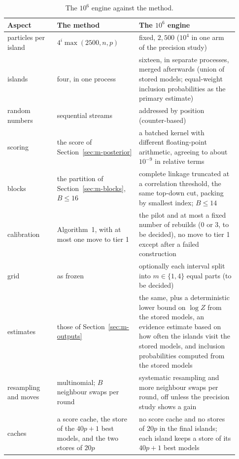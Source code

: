 \documentclass[11pt]{article}
\begin{document}
{\small
\begin{longtable}{@{}>{\raggedright\arraybackslash}p{0.2\linewidth}>{\raggedright\arraybackslash}p{0.33\linewidth}>{\raggedright\arraybackslash}p{0.4\linewidth}@{}}
\caption{The $10^6$ engine against the method.}\label{tab:m-1m}\\
\toprule
Aspect & The method & The $10^6$ engine \\ \midrule \endhead
particles per island & $4^i\max(2500,n,p)$ & fixed, $2{,}500$ ($10^4$ in one arm of the precision study) \\
islands & four, in one process & sixteen, in separate processes, merged afterwards (union of stored models; equal-weight inclusion probabilities as the primary estimate) \\
random numbers & sequential streams & addressed by position (counter-based) \\
scoring & the score of Section~\ref{sec:m-posterior} & a batched kernel with different floating-point arithmetic, agreeing to about $10^{-9}$ in relative terms \\
blocks & the partition of Section~\ref{sec:m-blocks}, $B\le16$ & complete linkage truncated at a correlation threshold, the same top-down cut, packing by smallest index; $B\le14$ \\
calibration & Algorithm~1, with at most one move to tier 1 & the pilot and at most a fixed number of rebuilds (0 or 3, to be decided), no move to tier 1 except after a failed construction \\
grid & as frozen & optionally each interval split into $m\in\{1,4\}$ equal parts (to be decided) \\
estimates & those of Section~\ref{sec:m-outputs} & the same, plus a deterministic lower bound on $\log Z$ from the stored models, an evidence estimate based on how often the islands visit the stored models, and inclusion probabilities computed from the stored models \\
resampling and moves & multinomial; $B$ neighbour swaps per round & systematic resampling and more neighbour swaps per round, off unless the precision study shows a gain \\
caches & a score cache, the store of the $40p+1$ best models, and the two stores of $20p$ & no score cache and no stores of $20p$ in the final islands; each island keeps a store of its $40p+1$ best models \\
\bottomrule
\end{longtable}}

\end{document}
